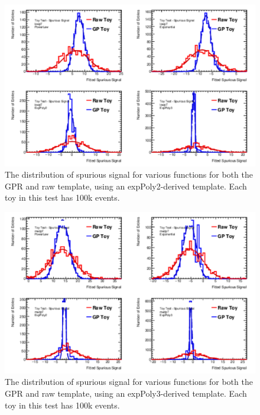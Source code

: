 \begin{figure} 
\begin{center}
  \includegraphics[width=\textwidth]{figures/background/gpr/validation/nominal/ToyTest_FitSigVals_lowpT_100k_noSig}   
\caption{The distribution of spurious signal for various functions for both the GPR and raw template, using an expPoly2-derived template. Each toy in this test has 100k events.}
\label{fig:lowpt_100k_noSig}
\end{center}
\end{figure}

\begin{figure} 
\begin{center}
  \includegraphics[width=\textwidth]{figures/background/gpr/validation/nominal/ToyTest_FitSigVals_medpT_100k_noSig}   
\caption{The distribution of spurious signal for various functions for both the GPR and raw template, using an expPoly3-derived template. Each toy in this test has 100k events.}
\label{fig:medpt_100k_noSig}
\end{center}
\end{figure}

